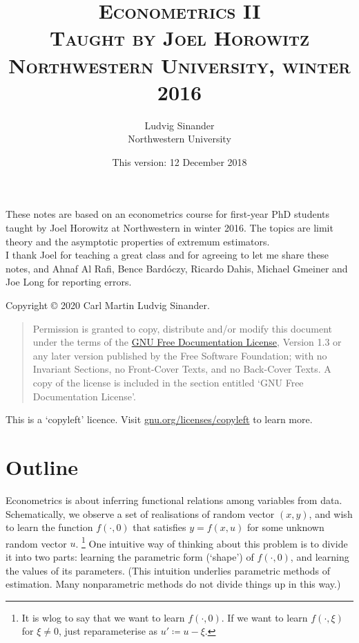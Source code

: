 \documentclass[11pt,letterpaper,reqno,oneside]{article}
\title{\scshape Econometrics II \\
	\vspace{0.5em}
	\large \scshape Taught by Joel Horowitz \\
	\large \scshape Northwestern University, winter 2016
	}
\author{Ludvig Sinander \\ Northwestern University}
\date{\small This version: 12 December 2018}
\begin{document}
\maketitle

\noindent
These notes are based on an econometrics course for first-year PhD students taught by Joel Horowitz at Northwestern in winter 2016. The topics are limit theory and the asymptotic properties of extremum estimators.\\

\noindent
I thank Joel for teaching a great class and for agreeing to let me share these notes, and Ahnaf Al Rafi, Bence Bardóczy, Ricardo Dahis, Michael Gmeiner and Joe Long for reporting errors.



\pagebreak
\hspace{1pt}\vfill
\noindent
Copyright \copyright{} 2020 Carl Martin Ludvig Sinander.

\begin{quotation}
\noindent
Permission is granted to copy, distribute and/or modify this document under the terms of the \href{https://www.gnu.org/licenses/fdl}{GNU Free Documentation License}, Version 1.3 or any later version published by the Free Software Foundation; with no Invariant Sections, no Front-Cover Texts, and no Back-Cover Texts. A copy of the license is included in the section entitled `GNU
Free Documentation License'.
\end{quotation}

\noindent
This is a `copyleft' licence.
Visit \href{https://www.gnu.org/licenses/copyleft}{gnu.org/licenses/copyleft} to learn more.



\pagebreak
{}
\tableofcontents
{}



\pagebreak
\section{Outline}
\label{sec:outline}


Econometrics is about inferring functional relations among variables from data. Schematically, we observe a set of realisations of random vector $(x,y)$, and wish to learn the function $f(\cdot,0)$ that satisfies $y=f(x,u)$ for some unknown random vector $u$.%
	\footnote{It is wlog to say that we want to learn $f(\cdot,0)$. If we want to learn $f(\cdot,\xi)$ for $\xi \neq 0$, just reparameterise as $u' \coloneqq u-\xi$.}
One intuitive way of thinking about this problem is to divide it into two parts: learning the parametric form (`shape') of $f(\cdot,0)$, and learning the values of its parameters. (This intuition underlies parametric methods of estimation. Many nonparametric methods do not divide things up in this way.)
\end{document}
